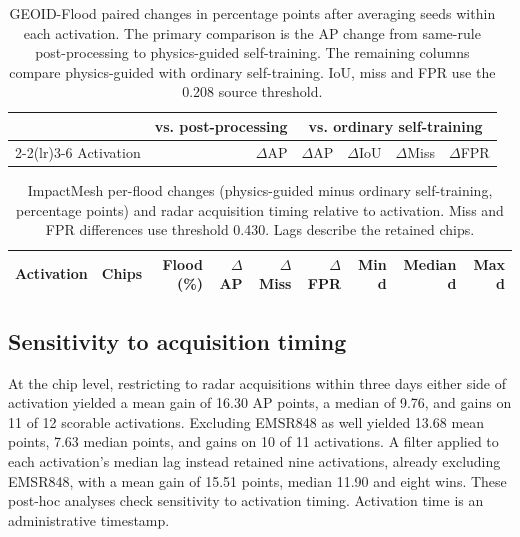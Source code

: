 \begin{table}[pos=H]
\caption{GEOID-Flood paired changes in percentage points after averaging seeds within each activation. The primary comparison is the AP change from same-rule post-processing to physics-guided self-training. The remaining columns compare physics-guided with ordinary self-training. IoU, miss and FPR use the 0.208 source threshold.}
\label{tab:geoid_events}
\centering
\begin{tabular}{@{}lrrrrr@{}}
\toprule
 & vs. post-processing & \multicolumn{4}{c}{vs. ordinary self-training} \\
\cmidrule(lr){2-2}\cmidrule(lr){3-6}
Activation & $\Delta$AP & $\Delta$AP & $\Delta$IoU & $\Delta$Miss & $\Delta$FPR \\
\midrule

\end{tabular}
\end{table}

\begin{table}[pos=H]
\centering
\caption{ImpactMesh per-flood changes (physics-guided minus ordinary self-training, percentage points) and radar acquisition timing relative to activation. Miss and FPR differences use threshold 0.430. Lags describe the retained chips.}
\label{tab:impactmesh_lag}
\begin{tabular}{@{}lrrrrrrrr@{}}
\toprule
Activation & Chips & Flood (\%) & $\Delta$AP & $\Delta$Miss & $\Delta$FPR & Min d & Median d & Max d \\
\midrule

\end{tabular}
\end{table}


\subsection{Sensitivity to acquisition timing}
\label{sec:acquisition_timing}
At the chip level, restricting to radar acquisitions within three days either side of activation yielded a mean gain of 16.30 AP points, a median of 9.76, and gains on 11 of 12 scorable activations. Excluding EMSR848 as well yielded 13.68 mean points, 7.63 median points, and gains on 10 of 11 activations. A filter applied to each activation's median lag instead retained nine activations, already excluding EMSR848, with a mean gain of 15.51 points, median 11.90 and eight wins. These post-hoc analyses check sensitivity to activation timing. Activation time is an administrative timestamp.


